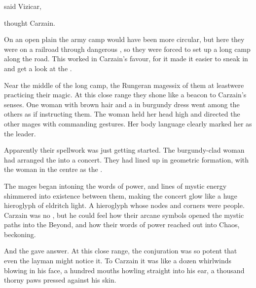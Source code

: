  said Vizicar, 

 thought Carzain.

On an open plain the army camp would have been more circular, but here they were \travelling on a railroad through dangerous \Wylde{}, so they were forced to set up a long camp along the road. 
This worked in Carzain's favour, for it made it easier to sneak in and get a look at the \ishrah. 

Near the middle of the long camp, the Rungeran mages\dash six of them at least\dash were practicing their magic. 
At this close range they shone like a beacon to Carzain's senses. 
One woman with brown hair and a in burgundy \travelling dress went among the others as if instructing them. 
The woman held her head high and directed the other mages with commanding gestures. 
Her body language clearly marked her as the \ishrah leader. 


Apparently their spellwork was just getting started. 
The burgundy-clad woman had arranged the \ishrah into a concert. 
They had lined up in geometric formation, with the woman in the centre as the \apex. 

The mages began intoning the \draconic words of power, and lines of mystic energy shimmered into existence between them, making the concert glow like a huge hieroglyph of eldritch light. 
A hieroglyph whose nodes and corners were people. 
Carzain was no \rethyax, but he could feel how their arcane symbols opened the mystic paths into the Beyond, and how their words of power reached out into Chaos, beckoning. 

And the \daemons gave answer. 
At this close range, the conjuration was so potent that even the layman might notice it. 
To Carzain it was like a dozen whirlwinds blowing in his face, a hundred mouths howling straight into his ear, a thousand thorny paws pressed against his skin. 

